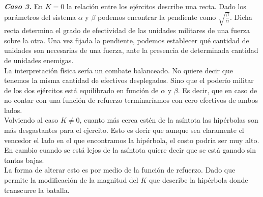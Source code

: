 \documentclass{sig-alternate}
\begin{document}
\textbf{\textit{Caso 3.}} 
En $K=0$ la relación entre los ejércitos describe una recta. Dado los parámetros del sistema $\alpha$ y $\beta$ podemos encontrar la pendiente como $\sqrt{\frac{\beta}{\alpha}}$. Dicha recta determina el grado de efectividad de las unidades militares de una fuerza sobre la otra. Una vez fijada la pendiente, podemos 
establecer qué cantidad de unidades son necesarias de una fuerza, ante la presencia de determinada cantidad de unidades enemigas.  \\
La interpretación f\'isica ser\'ia un combate balanceado. No quiere decir que tenemos la misma cantidad de efectivos desplegados. Sino que el poderío militar de los dos ej\'ercitos está equilibrado en función de $\alpha$ y $\beta$. Es decir, que en caso de no contar con una funci\'on de refuerzo terminar\'iamos con cero efectivos de ambos lados. \\
Volviendo al caso $K \ne 0$, cuanto m\'as cerca est\'en de la as\'intota las hip\'erbolas son m\'as desgastantes para el ejercito. Esto es decir que aunque sea claramente
el vencedor el lado en el que encontramos la hip\'erbola, el costo
podr\'ia ser muy alto. En cambio cuando se está lejos de la as\'intota
quiere decir que se está ganado sin tantas bajas. \\
La forma de alterar esto es por medio de la función de refuerzo. Dado que permite la modificación de la magnitud del $K$ que describe la hipérbola donde transcurre la batalla. 
\end{document}
